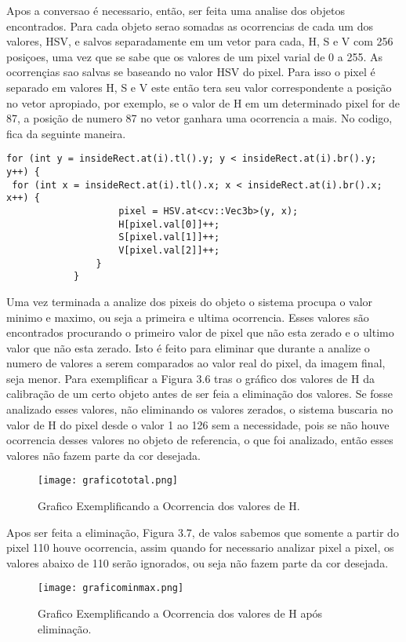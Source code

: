 Apos a conversao é necessario, então, ser feita uma analise dos objetos encontrados. Para cada objeto serao somadas as ocorrencias de cada um dos valores, HSV, e salvos separadamente em um vetor para cada, H, S e V com 256 posiçoes, uma vez que se sabe que os valores de um pixel varial de 0 a 255. As ocorrençias sao salvas se baseando no valor HSV do pixel. Para isso o pixel é separado em valores H, S e V este então tera seu valor correspondente a posição no vetor apropiado, por exemplo, se o valor de H em um determinado pixel for de 87, a posição de numero 87 no vetor ganhara uma ocorrencia a mais. No codigo, fica da seguinte maneira.
		\begin{lstlisting}
for (int y = insideRect.at(i).tl().y; y < insideRect.at(i).br().y; y++) {
 for (int x = insideRect.at(i).tl().x; x < insideRect.at(i).br().x; x++) {
	                pixel = HSV.at<cv::Vec3b>(y, x);
	                H[pixel.val[0]]++;
	                S[pixel.val[1]]++;
	                V[pixel.val[2]]++;
	            }
	        }	\end{lstlisting}

Uma vez terminada a analize dos pixeis do objeto o sistema procupa o valor minimo e maximo, ou seja a primeira e ultima ocorrencia. Esses valores são encontrados procurando o primeiro valor de pixel que não esta zerado e o ultimo valor que não esta zerado. Isto é feito para eliminar que durante a analize o numero de valores a serem comparados ao valor real do pixel, da imagem final, seja menor. Para exemplificar a Figura 3.6 tras o gráfico dos valores de H da calibração de um certo objeto antes de ser feia a eliminação dos valores. Se fosse analizado esses valores, não eliminando os valores zerados, o sistema buscaria no valor de H do pixel desde o valor 1 ao 126 sem a necessidade, pois se não houve ocorrencia desses valores no objeto de referencia, o que foi analizado, então esses valores não fazem parte da cor desejada.

\begin{figure}[!h]
	\centering
	\texttt{[image: graficototal.png]}
	\caption{Grafico Exemplificando a Ocorrencia dos valores de H.}
	\label{Grafico Exemplo}
\end{figure}

 Apos ser feita a eliminação, Figura 3.7, de valos sabemos que somente a partir do pixel 110 houve ocorrencia, assim quando for necessario analizar pixel a pixel, os valores abaixo de 110 serão ignorados, ou seja não fazem parte da cor desejada.
 \begin{figure}[!h]
 	\centering
 	\texttt{[image: graficominmax.png]}
 	\caption{Grafico Exemplificando a Ocorrencia dos valores de H após eliminação.}
 	\label{Grafico Exemplo}
 \end{figure}

